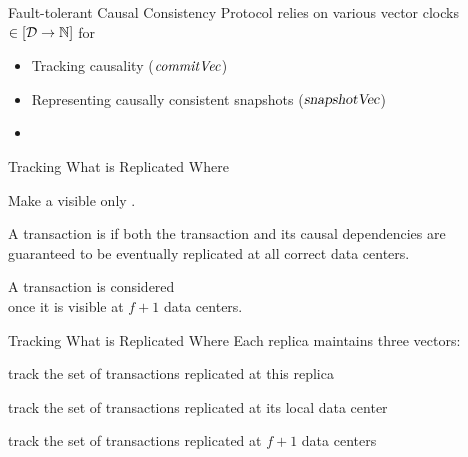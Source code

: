 
\begin{frame}{Fault-tolerant Causal Consistency Protocol}
  \unistore{} relies on various vector clocks $\in [\mathcal{D} \to \mathbb{N}]$ for \\[6pt]

  \begin{itemize}
    \setlength{\itemsep}{8pt}
    \item Tracking causality ($\mathit{commitVec}$)
    \item Representing causally consistent snapshots ($\textsl{snapshotVec}$)
    \item {}
  \end{itemize}
\end{frame}

\begin{frame}{Tracking What is Replicated Where}
  \begin{center}
    Make a   visible
    only .

    \pause
    \vspace{0.30cm}
    \begin{definition}[Uniform]
      A transaction is  if both the transaction
      and its causal dependencies are guaranteed to be eventually
      replicated at all correct data centers.
    \end{definition}

    \pause
    \vspace{0.50cm}
    A transaction is considered  \\[3pt]
    once it is visible at $f + 1$ data centers.
  \end{center}
\end{frame}

\begin{frame}{Tracking What is Replicated Where}
  Each replica maintains three vectors: \\[5pt]

  \begin{description}[<+->]
    \setlength{\itemsep}{10pt}
    \item[$\knownVC$:] track the set of transactions replicated at this replica
    \item[$\stableVC$:] track the set of transactions replicated at its local data center
    \item[$\uniformVC$:] track the set of transactions replicated at $f + 1$ data centers
  \end{description}
\end{frame}

